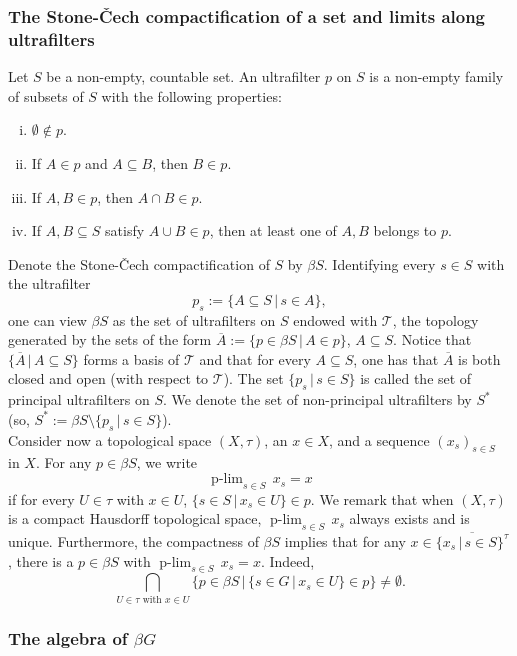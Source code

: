 \documentclass[graybox]{svmult}
\theoremstyle{definition}
\newcommand{\plimgG}[3]{\mathop {#1\text{-lim}}_{#2\in #3}\,}
\begin{document}
\subsubsection{The Stone-{\v C}ech compactification of a set and limits along ultrafilters}\label{sssec:UltrafilterBasics}
Let $S$ be a non-empty, countable set. An ultrafilter $p$ on $S$ is a non-empty family of subsets of $S$ with the following properties:
\begin{enumerate}[(i)]
    \item $\emptyset\not\in p$.
    \item If $A\in p$ and $A\subseteq B$, then $B\in p$.
    \item If $A,B\in p$, then $A\cap B\in p$.
    \item If $A,B\subseteq S$ satisfy $A\cup B\in p$, then at least one of $A,B$ belongs to $p$.
\end{enumerate}
Denote the Stone-{\v C}ech compactification of $S$ by $\beta S$.
Identifying every $s\in S$ with the  ultrafilter 
$$
p_s:=\{A\subseteq S\,|\,s\in A\},
$$
one can view $\beta S$ as the set of ultrafilters on $S$ endowed with $\mathcal T$,  the topology generated by the sets of the form $\overline A:=\{p\in\beta S\,|\,A\in p\}$, $A\subseteq S$.
Notice that $\{\overline A\,|\,A\subseteq S\}$ forms a basis of $\mathcal T$ and that for every $A\subseteq S$, one has that $\overline A$ is both closed and open (with respect to $\mathcal T$). 
The set $\{p_s\,|\,s\in S\}$ is called the set of principal ultrafilters on $S$. 
We denote the set of non-principal ultrafilters by $S^*$ (so, $S^*:=\beta S\setminus\{p_s\,|\,s\in S\}$).\\
Consider now a topological space $(X,\tau)$, an $x\in X$,  and a sequence $(x_s)_{s\in S}$ in $X$. For any $p\in\beta S$, we write 
$$
\plimgG{p}{s}{S}x_s=x
$$
if for every $U\in\tau$ with $x\in U$, $\{s\in S\,|\,x_s\in U\}\in p$.
We remark that when $(X, \tau)$ is a compact Hausdorff topological space, $\plimgG{p}{s}{S}x_s$ always exists and is unique.
Furthermore, the compactness of $\beta S$ implies that for any $x\in \overline{\{x_s\,|\,s\in S\}^{\tau}}$, there is a $p\in \beta S$ with $\plimgG{p}{s}{S}x_s=x$.
Indeed, 
$$
\bigcap_{U\in\tau\text{ with }x\in U} \{p\in\beta S\,|\,\{s\in G\,|\,x_s\in U\}\in p\}\neq \emptyset.
$$

\subsubsection{The algebra of \texorpdfstring{$\beta G$}{beta G}}\label{ssec:AlgebraOfBetaG}
\end{document}
